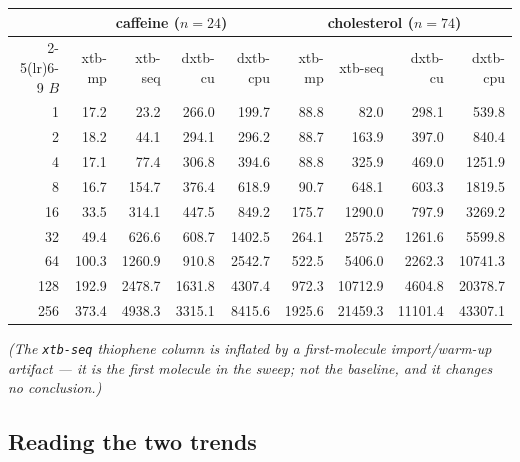 \documentclass[11pt]{article}
\newcommand{\code}[1]{\texttt{#1}}
\begin{document}
\begin{center}
\vspace{1em}
\begin{tabular}{r  rrrr  rrrr}
\toprule
 & \multicolumn{4}{c}{\textbf{caffeine} ($n=24$)} & \multicolumn{4}{c}{\textbf{cholesterol} ($n=74$)} \\
\cmidrule(lr){2-5}\cmidrule(lr){6-9}
$B$ & xtb-mp & xtb-seq & dxtb-cu & dxtb-cpu & xtb-mp & xtb-seq & dxtb-cu & dxtb-cpu \\
\midrule
1   & 17.2  & 23.2   & 266.0  & 199.7  & 88.8   & 82.0    & 298.1   & 539.8 \\
2   & 18.2  & 44.1   & 294.1  & 296.2  & 88.7   & 163.9   & 397.0   & 840.4 \\
4   & 17.1  & 77.4   & 306.8  & 394.6  & 88.8   & 325.9   & 469.0   & 1251.9 \\
8   & 16.7  & 154.7  & 376.4  & 618.9  & 90.7   & 648.1   & 603.3   & 1819.5 \\
16  & 33.5  & 314.1  & 447.5  & 849.2  & 175.7  & 1290.0  & 797.9   & 3269.2 \\
32  & 49.4  & 626.6  & 608.7  & 1402.5 & 264.1  & 2575.2  & 1261.6  & 5599.8 \\
64  & 100.3 & 1260.9 & 910.8  & 2542.7 & 522.5  & 5406.0  & 2262.3  & 10741.3 \\
128 & 192.9 & 2478.7 & 1631.8 & 4307.4 & 972.3  & 10712.9 & 4604.8  & 20378.7 \\
256 & 373.4 & 4938.3 & 3315.1 & 8415.6 & 1925.6 & 21459.3 & 11101.4 & 43307.1 \\
\bottomrule
\end{tabular}
\end{center}

\noindent\emph{(The \code{xtb-seq} thiophene column is inflated by a
first-molecule import/warm-up artifact --- it is the first molecule in the sweep;
not the baseline, and it changes no conclusion.)}

\subsection{Reading the two trends}
\end{document}
